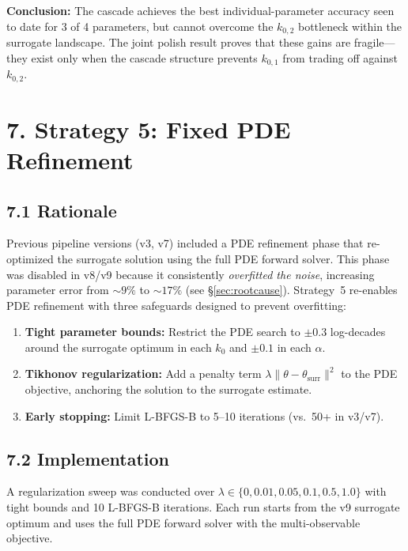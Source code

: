 \documentclass[11pt]{article}
\begin{document}
\textbf{Conclusion:} The cascade achieves the best individual-parameter
accuracy seen to date for 3 of 4 parameters, but cannot overcome the
$k_{0,2}$ bottleneck within the surrogate landscape.  The joint polish
result proves that these gains are fragile---they exist only when the cascade
structure prevents $k_{0,1}$ from trading off against $k_{0,2}$.


\section*{7. Strategy 5: Fixed PDE Refinement}\label{sec:strat5}

\subsection*{7.1 Rationale}

Previous pipeline versions (v3, v7) included a PDE refinement phase that
re-optimized the surrogate solution using the full PDE forward solver.  This
phase was disabled in v8/v9 because it consistently \emph{overfitted the noise},
increasing parameter error from ${\sim}9\%$ to ${\sim}17\%$ (see
\S\ref{sec:rootcause}).  Strategy~5 re-enables PDE refinement with three
safeguards designed to prevent overfitting:

\begin{enumerate}
  \item \textbf{Tight parameter bounds:} Restrict the PDE search to
        $\pm 0.3$ log-decades around the surrogate optimum in each $k_0$
        and $\pm 0.1$ in each $\alpha$.
  \item \textbf{Tikhonov regularization:} Add a penalty term
        $\lambda \|\theta - \theta_{\text{surr}}\|^2$ to the PDE objective,
        anchoring the solution to the surrogate estimate.
  \item \textbf{Early stopping:} Limit L-BFGS-B to 5--10 iterations
        (vs.\ 50+ in v3/v7).
\end{enumerate}

\subsection*{7.2 Implementation}

A regularization sweep was conducted over
$\lambda \in \{0, 0.01, 0.05, 0.1, 0.5, 1.0\}$ with tight bounds and
10 L-BFGS-B iterations.  Each run starts from the v9 surrogate optimum
and uses the full PDE forward solver with the multi-observable objective.
\end{document}
